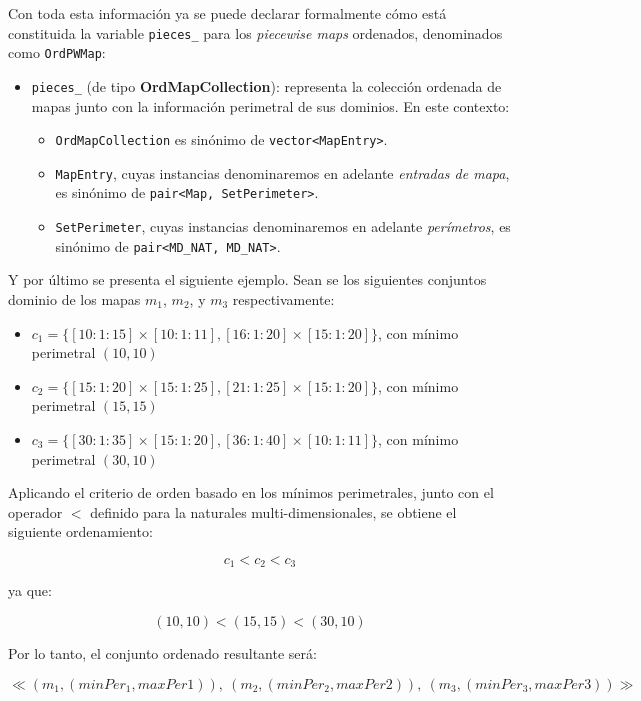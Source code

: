 Con toda esta información ya se puede declarar formalmente cómo está constituida la variable \texttt{pieces\_} para los \textit{piecewise maps} ordenados, denominados como \texttt{OrdPWMap}:

\begin{itemize}
  \item \texttt{pieces\_} (de tipo \textbf{OrdMapCollection}): 
  representa la colección ordenada de mapas junto con la información perimetral 
  de sus dominios.  
  En este contexto:
  \begin{itemize}
    \item \texttt{OrdMapCollection} es sinónimo de \texttt{vector<MapEntry>}.
    \item \texttt{MapEntry}, cuyas instancias denominaremos en adelante \textit{entradas de mapa}, es sinónimo de \texttt{pair<Map, SetPerimeter>}.
    \item \texttt{SetPerimeter}, cuyas instancias denominaremos en adelante \textit{perímetros}, es sinónimo de \texttt{pair<MD\_NAT, MD\_NAT>}.
  \end{itemize}
\end{itemize}


Y por último se presenta el siguiente ejemplo. Sean se los siguientes conjuntos dominio de los mapas $m_1$, $m_2$, y $m_3$ respectivamente:

\begin{itemize}
    \item $c_1 = \{[10:1:15]\times[10:1:11],[16:1:20]\times[15:1:20]\}$, con mínimo perimetral $(10,10)$
    \item $c_2 = \{[15:1:20]\times[15:1:25],[21:1:25]\times[15:1:20]\}$, con mínimo perimetral $(15,15)$
    \item $c_3 = \{[30:1:35]\times[15:1:20],[36:1:40]\times[10:1:11]\}$, con mínimo perimetral $(30,10)$
\end{itemize}

Aplicando el criterio de orden basado en los mínimos perimetrales, junto con el operador $<$ definido para la naturales multi-dimensionales, se obtiene el siguiente ordenamiento:

\begin{center}
\[
c_1 < c_2 < c_3
\]

ya que:

\[
(10,10) < (15, 15) < (30, 10)
\]

Por lo tanto, el conjunto ordenado resultante será:

\[
\ll (m_1,(minPer_1, maxPer1)),\ (m_2,(minPer_2, maxPer2)),\ (m_3, (minPer_3, maxPer3))\gg
\]
\end{center}

